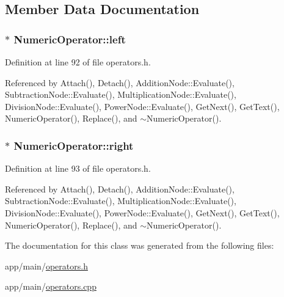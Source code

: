 \subsection{Member Data Documentation}
\subsubsection[{\texorpdfstring{left}{left}}]{$\ast$ Numeric\+Operator\+::left\hspace{0.3cm}{\ttfamily [protected]}}\hypertarget{classNumericOperator_a55da3c4075408deff978711030fa8258}{}\label{classNumericOperator_a55da3c4075408deff978711030fa8258}


Definition at line 92 of file operators.\+h.



Referenced by Attach(), Detach(), Addition\+Node\+::\+Evaluate(), Subtraction\+Node\+::\+Evaluate(), Multiplication\+Node\+::\+Evaluate(), Division\+Node\+::\+Evaluate(), Power\+Node\+::\+Evaluate(), Get\+Next(), Get\+Text(), Numeric\+Operator(), Replace(), and $\sim$\+Numeric\+Operator().

\subsubsection[{\texorpdfstring{right}{right}}]{$\ast$ Numeric\+Operator\+::right\hspace{0.3cm}{\ttfamily [protected]}}\hypertarget{classNumericOperator_aa2c5b5bea59bbb068bc6013bc5cac483}{}\label{classNumericOperator_aa2c5b5bea59bbb068bc6013bc5cac483}


Definition at line 93 of file operators.\+h.



Referenced by Attach(), Detach(), Addition\+Node\+::\+Evaluate(), Subtraction\+Node\+::\+Evaluate(), Multiplication\+Node\+::\+Evaluate(), Division\+Node\+::\+Evaluate(), Power\+Node\+::\+Evaluate(), Get\+Next(), Get\+Text(), Numeric\+Operator(), Replace(), and $\sim$\+Numeric\+Operator().



The documentation for this class was generated from the following files\+:\begin{DoxyCompactItemize}
\item 
app/main/\hyperlink{operators_8h}{operators.\+h}\item 
app/main/\hyperlink{operators_8cpp}{operators.\+cpp}\end{DoxyCompactItemize}
